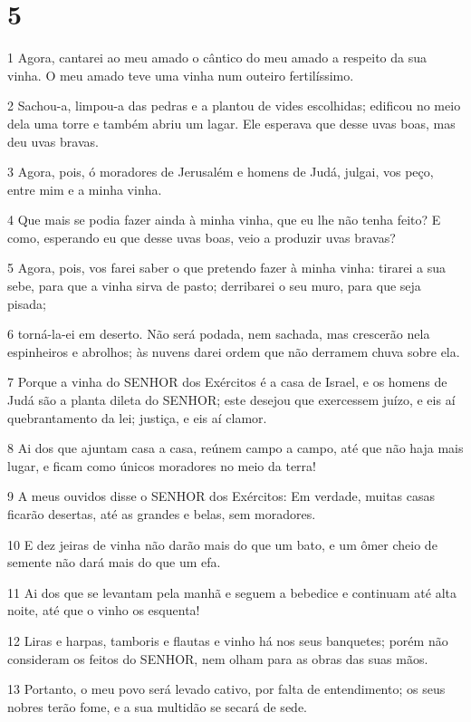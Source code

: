 \chapter{5}

\par 1 Agora, cantarei ao meu amado o cântico do meu amado a respeito da sua vinha. O meu amado teve uma vinha num outeiro fertilíssimo.
\par 2 Sachou-a, limpou-a das pedras e a plantou de vides escolhidas; edificou no meio dela uma torre e também abriu um lagar. Ele esperava que desse uvas boas, mas deu uvas bravas.
\par 3 Agora, pois, ó moradores de Jerusalém e homens de Judá, julgai, vos peço, entre mim e a minha vinha.
\par 4 Que mais se podia fazer ainda à minha vinha, que eu lhe não tenha feito? E como, esperando eu que desse uvas boas, veio a produzir uvas bravas?
\par 5 Agora, pois, vos farei saber o que pretendo fazer à minha vinha: tirarei a sua sebe, para que a vinha sirva de pasto; derribarei o seu muro, para que seja pisada;
\par 6 torná-la-ei em deserto. Não será podada, nem sachada, mas crescerão nela espinheiros e abrolhos; às nuvens darei ordem que não derramem chuva sobre ela.
\par 7 Porque a vinha do SENHOR dos Exércitos é a casa de Israel, e os homens de Judá são a planta dileta do SENHOR; este desejou que exercessem juízo, e eis aí quebrantamento da lei; justiça, e eis aí clamor.
\par 8 Ai dos que ajuntam casa a casa, reúnem campo a campo, até que não haja mais lugar, e ficam como únicos moradores no meio da terra!
\par 9 A meus ouvidos disse o SENHOR dos Exércitos: Em verdade, muitas casas ficarão desertas, até as grandes e belas, sem moradores.
\par 10 E dez jeiras de vinha não darão mais do que um bato, e um ômer cheio de semente não dará mais do que um efa.
\par 11 Ai dos que se levantam pela manhã e seguem a bebedice e continuam até alta noite, até que o vinho os esquenta!
\par 12 Liras e harpas, tamboris e flautas e vinho há nos seus banquetes; porém não consideram os feitos do SENHOR, nem olham para as obras das suas mãos.
\par 13 Portanto, o meu povo será levado cativo, por falta de entendimento; os seus nobres terão fome, e a sua multidão se secará de sede.
